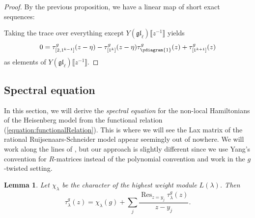 \documentclass[11pt]{report}
\newtheorem{lemma}[theorem]{Lemma}
\theoremstyle{definition}
\theoremstyle{remark}
\theoremstyle{remark}
\begin{document}
\begin{proof}
By the previous proposition, we have a linear map of short exact sequences: \\
{\small
{}
}

Taking the trace over everything except $Y(\mathfrak{gl}_\ell)\llbracket z^{-1} \rrbracket$ yields
\begin{equation*}
0 = \tau_{[2,1^{k-1}]}^g(z-\eta) - \tau_{[1^k]}^g(z-\eta) \tau_{\ydiagram{1}}^g(z) + \tau_{[1^{k+1}]}^g(z)
\end{equation*}
as elements of $Y(\mathfrak{gl}_\ell)\llbracket z^{-1} \rrbracket$.
\end{proof}

\subsection{Spectral equation}

In this section, we will derive the \emph{spectral equation} for the non-local Hamiltonians of the Heisenberg model from the functional relation (\ref{equation:functionalRelation}). This is where we will see the Lax matrix of the rational Ruijsenaars-Schneider model appear seemingly out of nowhere. We will work along the lines of \cite{book:arutyunov:betheAnsatz}, but our approach is slightly different since we use Yang's convention for $R$-matrices instead of the polynomial convention and work in the $g$-twisted setting.

\begin{lemma}\label{lemma:transferMatrixExpansion}
Let $\chi_\lambda$ be the character of the highest weight module $L(\lambda)$. Then
\begin{equation*}
\tau_\lambda^g(z) = \chi_\lambda(g) + \sum_j \frac{\operatorname{Res}_{z=y_j} \tau_\lambda^g(z)}{z-y_j}.
\end{equation*}
\end{lemma}
\end{document}
